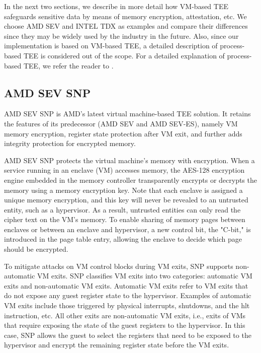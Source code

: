 In the next two sections, we describe in more detail how VM-based TEE safeguards sensitive data by means of memory encryption, attestation, etc. We choose AMD SEV and INTEL TDX as examples and compare their differences since they may be widely used by the industry in the future.
Also, since our implementation is based on VM-based TEE, 
a detailed description of process-based TEE is considered out of the scope. For a detailed explanation of process-based TEE, we refer the reader to \cite*{cryptoeprint:2016/086} \cite*{10.1145/2487726.2488370} \cite*{SGX_PAPER_LIST}.


\subsection{AMD SEV SNP}
AMD SEV SNP\cite*{SEV_SNP_white_book} is AMD's latest virtual machine-based TEE solution. It retains the features of its predecessor (AMD SEV\cite*{sev} and AMD SEV-ES\cite*{sev_es}), namely VM memory 
encryption, register state protection after VM exit, and further adds integrity protection for encrypted memory.

AMD SEV SNP protects the virtual machine's memory with encryption. When a service running in an enclave (VM) accesses memory, the AES-128 encryption engine embedded in the memory controller 
transparently encrypts or decrypts the memory using a memory encryption key. Note that each enclave is assigned a unique memory encryption, and this key will never be revealed to an untrusted 
entity, such as a hypervisor. As a result, untrusted entities can only read the cipher text on the VM's memory. To enable sharing of memory pages between enclaves or between an enclave and 
hypervisor, a new control bit, the "C-bit," is introduced in the page table entry, allowing the enclave to decide which page should be encrypted.

To mitigate attacks on VM control blocks during VM exits, SNP supports non-automatic VM exits. SNP classifies VM exits into two categories: automatic VM exits and non-automatic VM exits. 
Automatic VM exits refer to VM exits that do not expose any guest register state to the hypervisor. Examples of automatic VM exits include those triggered by physical interrupts, shutdowns, 
and the hlt instruction, etc. All other exits are non-automatic VM exits, i.e., exits of VMs that require exposing the state of the guest registers to the hypervisor. In this case, 
SNP allows the guest to select the registers that need to be exposed to the hypervisor and encrypt the remaining register state before the VM exits.

